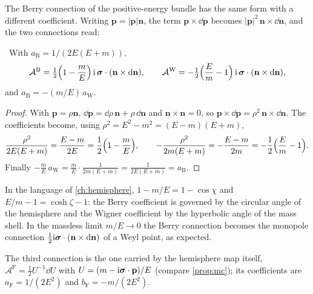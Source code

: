 The Berry connection of the positive-energy bundle has the same form with a different coefficient. Writing $\mathbf p=|\mathbf p|\mathbf n$, the term $\mathbf p\times\dd\mathbf p$ becomes $|\mathbf p|^2\,\mathbf n\times\dd\mathbf n$, and the two connections read:

\begin{theorem}\label{thm:halfangle}\ver\
With $a_{\mathrm B}=1/(2E(E+m))$,
\[
\mathcal A^{\mathrm B}=\tfrac12\Bigl(1-\frac mE\Bigr)\,\mathrm{i}\,\boldsymbol{\sigma}\cdot(\mathbf n\times\mathrm{d}\mathbf n),\qquad
\mathcal A^{\mathrm W}=-\tfrac12\Bigl(\frac Em-1\Bigr)\,\mathrm{i}\,\boldsymbol{\sigma}\cdot(\mathbf n\times\mathrm{d}\mathbf n),
\]
and $a_{\mathrm B}=-(m/E)\,a_{\mathrm W}$.
\end{theorem}
\begin{proof}
With $\mathbf p=\rho\mathbf n$, $\dd\mathbf p=\dd\rho\,\mathbf n+\rho\,\dd\mathbf n$ and $\mathbf n\times\mathbf n=0$, so $\mathbf p\times\dd\mathbf p=\rho^2\,\mathbf n\times\dd\mathbf n$. The coefficients become, using $\rho^2=E^2-m^2=(E-m)(E+m)$,
\[
\frac{\rho^2}{2E(E+m)}=\frac{E-m}{2E}=\frac12\Bigl(1-\frac mE\Bigr),\qquad -\frac{\rho^2}{2m(E+m)}=-\frac{E-m}{2m}=-\frac12\Bigl(\frac Em-1\Bigr).
\]
Finally $-\frac mE\,a_{\mathrm W}=\frac m E\cdot\frac1{2m(E+m)}=\frac1{2E(E+m)}=a_{\mathrm B}$.
\end{proof}


In the language of \cref{ch:hemisphere}, $1-m/E=1-\cos\chi$ and $E/m-1=\cosh\zeta-1$: the Berry coefficient is governed by the circular angle of the hemisphere and the Wigner coefficient by the hyperbolic angle of the mass shell. In the massless limit $m/E\to0$ the Berry connection becomes the monopole connection $\frac12\mathrm{i}\boldsymbol{\sigma}\cdot(\mathbf n\times\mathrm{d}\mathbf n)$ of a Weyl point, as expected.

The third connection is the one carried by the hemisphere map itself, $\mathcal A^{\mathrm F}=\frac12U^{-1}\dd U$ with $U=(m-\mathrm{i}\boldsymbol{\sigma}\cdot\mathbf p)/E$ (compare \cref{prop:mc}); its coefficients are $a_{\mathrm F}=1/(2E^2)$ and $b_{\mathrm F}=-m/(2E^2)$.

